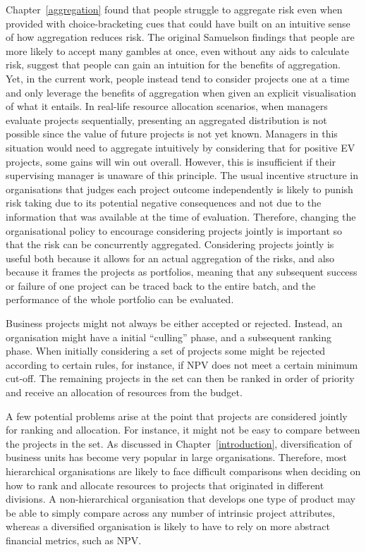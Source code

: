 \documentclass[a4paper, nobind, dvipsnames]{templates/ociamthesis}
\theoremstyle{definition}
\theoremstyle{definition}
\theoremstyle{definition}
\theoremstyle{definition}
\theoremstyle{remark}
\begin{document}
Chapter~\ref{aggregation} found that people struggle to aggregate risk even
when provided with choice-bracketing cues that could have built on an intuitive
sense of how aggregation reduces risk. The original Samuelson findings that
people are more likely to accept many gambles at once, even without any aids to
calculate risk, suggest that people can gain an intuition for the benefits of
aggregation. Yet, in the current work, people instead tend to consider projects
one at a time and only leverage the benefits of aggregation when given an
explicit visualisation of what it entails. In real-life resource allocation
scenarios, when managers evaluate projects sequentially, presenting an
aggregated distribution is not possible since the value of future projects is
not yet known. Managers in this situation would need to aggregate intuitively by
considering that for positive EV projects, some gains will win out overall.
However, this is insufficient if their supervising manager is unaware of this
principle. The usual incentive structure in organisations that judges each
project outcome independently is likely to punish risk taking due to its
potential negative consequences and not due to the information that was
available at the time of evaluation. Therefore, changing the organisational
policy to encourage considering projects jointly is important so that the risk
can be concurrently aggregated. Considering projects jointly is useful both
because it allows for an actual aggregation of the risks, and also because it
frames the projects as portfolios, meaning that any subsequent success or
failure of one project can be traced back to the entire batch, and the
performance of the whole portfolio can be evaluated.

Business projects might not always be either accepted or rejected. Instead, an
organisation might have a initial ``culling'' phase, and a subsequent ranking
phase. When initially considering a set of projects some might be rejected
according to certain rules, for instance, if NPV does not meet a certain minimum
cut-off. The remaining projects in the set can then be ranked in order of
priority and receive an allocation of resources from the budget.

A few potential problems arise at the point that projects are considered jointly
for ranking and allocation. For instance, it might not be easy to compare
between the projects in the set. As discussed in Chapter~\ref{introduction},
diversification of business units has become very popular in large
organisations. Therefore, most hierarchical organisations are likely to face
difficult comparisons when deciding on how to rank and allocate resources to
projects that originated in different divisions. A non-hierarchical organisation
that develops one type of product may be able to simply compare across any
number of intrinsic project attributes, whereas a diversified organisation is
likely to have to rely on more abstract financial metrics, such as NPV.
\end{document}
